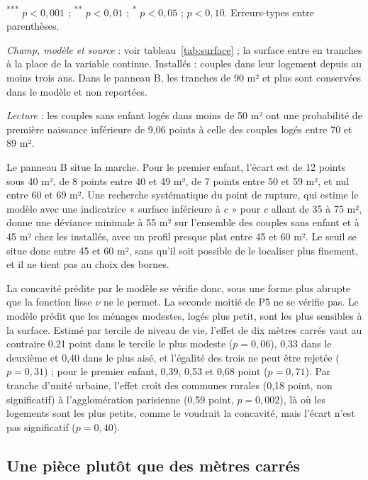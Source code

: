 \documentclass[11pt,a4paper]{article}
\theoremstyle{plain}
\theoremstyle{definition}
\theoremstyle{remark}
\newcommand{\sym}[1]{\textsuperscript{#1}}
\begin{document}
\begin{table}[htbp]
\begin{threeparttable}
\begin{tablenotes}\scriptsize
\item \sym{***} $p<0{,}001$ ; \sym{**} $p<0{,}01$ ; \sym{*} $p<0{,}05$ ; \sym{\dag} $p<0{,}10$. Erreurs-types entre parenthèses.
\item \textit{Champ, modèle et source} : voir tableau~\ref{tab:surface} ; la surface entre en tranches à la place de la variable continue. Installés : couples dans leur logement depuis au moins trois ans. Dans le panneau B, les tranches de 90 m² et plus sont conservées dans le modèle et non reportées.
\item \textit{Lecture} : les couples sans enfant logés dans moins de 50 m² ont une probabilité de première naissance inférieure de 9,06 points à celle des couples logés entre 70 et 89 m².
\end{tablenotes}
\end{threeparttable}
\end{table}

Le panneau B situe la marche. Pour le premier enfant, l'écart est de 12 points sous 40 m², de 8 points entre 40 et 49 m², de 7 points entre 50 et 59 m², et nul entre 60 et 69 m². Une recherche systématique du point de rupture, qui estime le modèle avec une indicatrice « surface inférieure à $c$ » pour $c$ allant de 35 à 75 m², donne une déviance minimale à 55 m² sur l'ensemble des couples sans enfant et à 45 m² chez les installés, avec un profil presque plat entre 45 et 60 m². Le seuil se situe donc entre 45 et 60 m², sans qu'il soit possible de le localiser plus finement, et il ne tient pas au choix des bornes.

La concavité prédite par le modèle se vérifie donc, sous une forme plus abrupte que la fonction lisse $\nu$ ne le permet. La seconde moitié de P5 ne se vérifie pas. Le modèle prédit que les ménages modestes, logés plus petit, sont les plus sensibles à la surface. Estimé par tercile de niveau de vie, l'effet de dix mètres carrés vaut au contraire 0,21 point dans le tercile le plus modeste ($p = 0{,}06$), 0,33 dans le deuxième et 0,40 dans le plus aisé, et l'égalité des trois ne peut être rejetée ($p = 0{,}31$) ; pour le premier enfant, 0,39, 0,53 et 0,68 point ($p = 0{,}71$). Par tranche d'unité urbaine, l'effet croît des communes rurales (0,18 point, non significatif) à l'agglomération parisienne (0,59 point, $p = 0{,}002$), là où les logements sont les plus petits, comme le voudrait la concavité, mais l'écart n'est pas significatif ($p = 0{,}40$).

\subsection{Une pièce plutôt que des mètres carrés}\label{sec:pieces}
\end{document}
